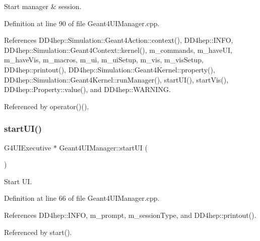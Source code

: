 Start manager \& session. 



Definition at line 90 of file Geant4\+U\+I\+Manager.\+cpp.



References D\+D4hep\+::\+Simulation\+::\+Geant4\+Action\+::context(), D\+D4hep\+::\+I\+N\+FO, D\+D4hep\+::\+Simulation\+::\+Geant4\+Context\+::kernel(), m\+\_\+commands, m\+\_\+have\+UI, m\+\_\+have\+Vis, m\+\_\+macros, m\+\_\+ui, m\+\_\+ui\+Setup, m\+\_\+vis, m\+\_\+vis\+Setup, D\+D4hep\+::printout(), D\+D4hep\+::\+Simulation\+::\+Geant4\+Kernel\+::property(), D\+D4hep\+::\+Simulation\+::\+Geant4\+Kernel\+::run\+Manager(), start\+U\+I(), start\+Vis(), D\+D4hep\+::\+Property\+::value(), and D\+D4hep\+::\+W\+A\+R\+N\+I\+NG.



Referenced by operator()().

\hypertarget{class_d_d4hep_1_1_simulation_1_1_geant4_u_i_manager_a9992d662309b9d5bcd67fba232801738}{}\label{class_d_d4hep_1_1_simulation_1_1_geant4_u_i_manager_a9992d662309b9d5bcd67fba232801738} 
\subsubsection{\texorpdfstring{start\+U\+I()}{startUI()}}
{\footnotesize\ttfamily G4\+U\+I\+Executive $\ast$ Geant4\+U\+I\+Manager\+::start\+UI (\begin{DoxyParamCaption}{ }\end{DoxyParamCaption})}



Start UI. 



Definition at line 66 of file Geant4\+U\+I\+Manager.\+cpp.



References D\+D4hep\+::\+I\+N\+FO, m\+\_\+prompt, m\+\_\+session\+Type, and D\+D4hep\+::printout().



Referenced by start().

\hypertarget{class_d_d4hep_1_1_simulation_1_1_geant4_u_i_manager_a70ee5c55162faf4f3b77843449c8e799}{}\label{class_d_d4hep_1_1_simulation_1_1_geant4_u_i_manager_a70ee5c55162faf4f3b77843449c8e799} 
